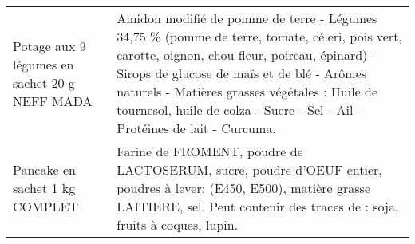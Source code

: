 \begin{longtable}{p{5cm}p{10cm}}
                                                            Potage aux 9 légumes en sachet 20 g NEFF MADA &                                                                                                                                                                                                                                                                                                                                                                                                                                                                                                                                                                                                                                                                                                               Amidon modifié de pomme de terre - Légumes 34,75 \% (pomme de terre, tomate, céleri, pois vert, carotte, oignon, chou-fleur, poireau, épinard) - Sirops de glucose de maïs et de blé - Arômes naturels - Matières grasses végétales : Huile de tournesol, huile de colza - Sucre - Sel - Ail - Protéines de lait - Curcuma. \\
                                                                           Pancake en sachet 1 kg COMPLET &                                                                                                                                                                                                                                                                                                                                                                                                                                                                                                                                                                                                                                                                                                                                                                                                                                          Farine de FROMENT, poudre de LACTOSERUM, sucre, poudre d'OEUF entier, poudres à lever: (E450, E500), matière grasse LAITIERE, sel.  Peut contenir des traces de : soja, fruits à coques, lupin. \\

\end{longtable}
